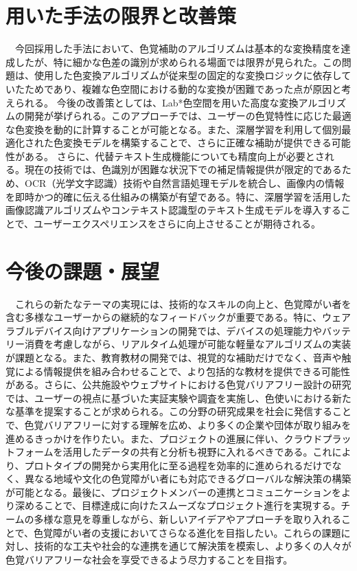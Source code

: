 \section{用いた手法の限界と改善策}
　今回採用した手法において、色覚補助のアルゴリズムは基本的な変換精度を達成したが、特に細かな色差の識別が求められる場面では限界が見られた。この問題は、使用した色変換アルゴリズムが従来型の固定的な変換ロジックに依存していたためであり、複雑な色空間における動的な変換が困難であった点が原因と考えられる。
今後の改善策としては、Lab*色空間を用いた高度な変換アルゴリズムの開発が挙げられる。このアプローチでは、ユーザーの色覚特性に応じた最適な色変換を動的に計算することが可能となる。また、深層学習を利用して個別最適化された色変換モデルを構築することで、さらに正確な補助が提供できる可能性がある。
さらに、代替テキスト生成機能についても精度向上が必要とされる。現在の技術では、色識別が困難な状況下での補足情報提供が限定的であるため、OCR（光学文字認識）技術や自然言語処理モデルを統合し、画像内の情報を即時かつ的確に伝える仕組みの構築が有望である。特に、深層学習を活用した画像認識アルゴリズムやコンテキスト認識型のテキスト生成モデルを導入することで、ユーザーエクスペリエンスをさらに向上させることが期待される。

\section{今後の課題・展望}
　これらの新たなテーマの実現には、技術的なスキルの向上と、色覚障がい者を含む多様なユーザーからの継続的なフィードバックが重要である。特に、ウェアラブルデバイス向けアプリケーションの開発では、デバイスの処理能力やバッテリー消費を考慮しながら、リアルタイム処理が可能な軽量なアルゴリズムの実装が課題となる。また、教育教材の開発では、視覚的な補助だけでなく、音声や触覚による情報提供を組み合わせることで、より包括的な教材を提供できる可能性がある。さらに、公共施設やウェブサイトにおける色覚バリアフリー設計の研究では、ユーザーの視点に基づいた実証実験や調査を実施し、色使いにおける新たな基準を提案することが求められる。この分野の研究成果を社会に発信することで、色覚バリアフリーに対する理解を広め、より多くの企業や団体が取り組みを進めるきっかけを作りたい。また、プロジェクトの進展に伴い、クラウドプラットフォームを活用したデータの共有と分析も視野に入れるべきである。これにより、プロトタイプの開発から実用化に至る過程を効率的に進められるだけでなく、異なる地域や文化の色覚障がい者にも対応できるグローバルな解決策の構築が可能となる。最後に、プロジェクトメンバーの連携とコミュニケーションをより深めることで、目標達成に向けたスムーズなプロジェクト進行を実現する。チームの多様な意見を尊重しながら、新しいアイデアやアプローチを取り入れることで、色覚障がい者の支援においてさらなる進化を目指したい。これらの課題に対し、技術的な工夫や社会的な連携を通じて解決策を模索し、より多くの人々が色覚バリアフリーな社会を享受できるよう尽力することを目指す。

\newpage\clearpage
\vspace*{-20pt}
\printbibliography[segment=\therefsegment,heading=subbibliography]
